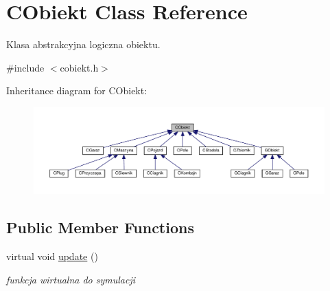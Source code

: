 \hypertarget{class_c_obiekt}{}\section{C\+Obiekt Class Reference}
\label{class_c_obiekt}


Klasa abstrakcyjna logiczna obiektu.  




{\ttfamily \#include $<$cobiekt.\+h$>$}



Inheritance diagram for C\+Obiekt\+:\nopagebreak
\begin{figure}[H]
\begin{center}
\leavevmode
\includegraphics[width=350pt]{class_c_obiekt__inherit__graph}
\end{center}
\end{figure}
\subsection*{Public Member Functions}
\begin{DoxyCompactItemize}
\item 
\mbox{\label{class_c_obiekt_adc05eb9790386eebbe24a31e434fd18f}} 
virtual void \mbox{\hyperlink{class_c_obiekt_adc05eb9790386eebbe24a31e434fd18f}{update}} ()
\begin{DoxyCompactList}\small\item\em funkcja wirtualna do symulacji \end{DoxyCompactList}\end{DoxyCompactItemize}
